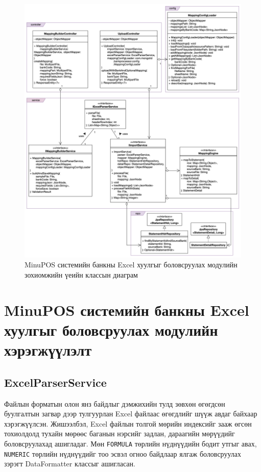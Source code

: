 \begin{figure}[H]
		\centering
		\includegraphics[width=17cm]{images/design.png}
		\caption{MinuPOS системийн банкны Excel хуулгыг боловсруулах модулийн зохиомжийн үеийн классын диаграм}
		\label{fig:design}
\end{figure}

\newpage
\section{MinuPOS системийн банкны Excel хуулгыг боловсруулах модулийн хэрэгжүүлэлт}

\subsection{ExcelParserService}
Файлын форматын олон янз байдлыг дэмжихийн тулд зөвхөн өгөгдсөн буулгалтын загвар дээр тулгуурлан Excel файлаас өгөгдлийг шүүж авдаг байхаар хэрэгжүүлсэн. Жишээлбэл, Excel файлын толгой мөрийн индексийг зааж өгсөн тохиолдолд тухайн мөрөөс баганын нэрсийг задлан, дараагийн мөрүүдийг боловсруулахад ашигладаг. Мөн \verb|FORMULA| төрлийн нүднүүдийн бодит утгыг авах, \verb|NUMERIC| төрлийн нүднүүдийг тоо эсвэл огноо байдлаар ялгаж боловсруулах зэрэгт DataFormatter классыг ашигласан.\\

